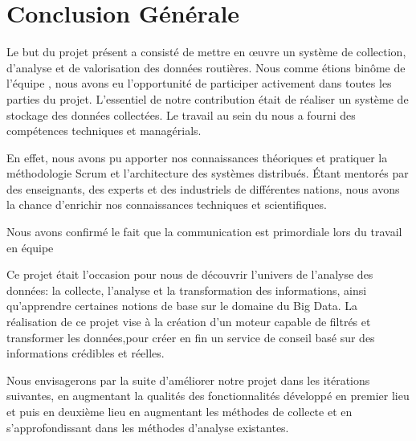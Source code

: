 \chapter*{Conclusion Générale}

Le but du projet présent a consisté de mettre en \oe{}uvre un système de
collection, d'analyse et de valorisation des données routières. Nous comme
étions binôme de l'équipe , nous avons eu l'opportunité
de participer activement dans toutes les parties du projet. L'essentiel de
notre contribution était de réaliser un système de stockage des données
collectées. Le travail au sein du  nous a fourni des
compétences techniques et managérials.

En effet, nous avons pu apporter nos connaissances théoriques et pratiquer la
méthodologie Scrum et l'architecture des systèmes distribués. Étant mentorés
par des enseignants, des experts et des industriels de différentes nations,
nous avons la chance d'enrichir nos connaissances techniques et scientifiques.

Nous avons confirmé le fait que la communication est primordiale lors du travail en équipe

%

Ce projet était l’occasion pour nous de découvrir l’univers de l'analyse des
données: la collecte, l'analyse et la transformation des informations, ainsi
qu’apprendre certaines notions de base sur le domaine du Big Data.  La
réalisation de ce  projet vise à la création d'un moteur capable de filtrés et
transformer les données,pour créer en fin un service de conseil basé sur des
informations crédibles et réelles.

Nous envisagerons par la suite d’améliorer notre projet dans les itérations
suivantes, en augmentant la qualités des fonctionnalités développé en premier
lieu et puis en deuxième lieu en augmentant les méthodes de collecte et en
s'approfondissant dans les méthodes d'analyse existantes.
